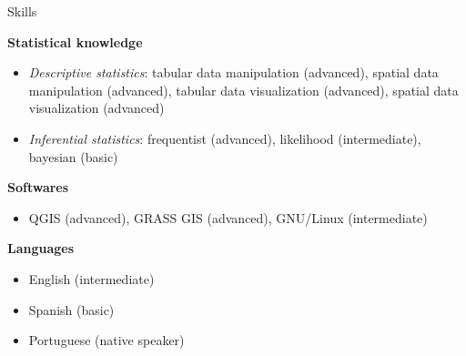 \documentclass{resume}
\begin{document}
\begin{rSection}{Skills}
\begin{itemize}
\end{itemize} 

{\bf Statistical knowledge}

\begin{itemize} 
\item {\it Descriptive statistics}: tabular data manipulation (advanced), spatial data manipulation (advanced), tabular data visualization (advanced), spatial data visualization (advanced)

\item {\it Inferential statistics}: frequentist (advanced), likelihood (intermediate), bayesian (basic)
\end{itemize}

{\bf Softwares}
\begin{itemize}
\item QGIS (advanced), GRASS GIS (advanced), GNU/Linux (intermediate)
\end{itemize}

{\bf Languages}
\begin{itemize}
\item English (intermediate)
\item Spanish (basic)
\item Portuguese (native speaker)
\end{itemize}

\end{rSection}

\end{document}
